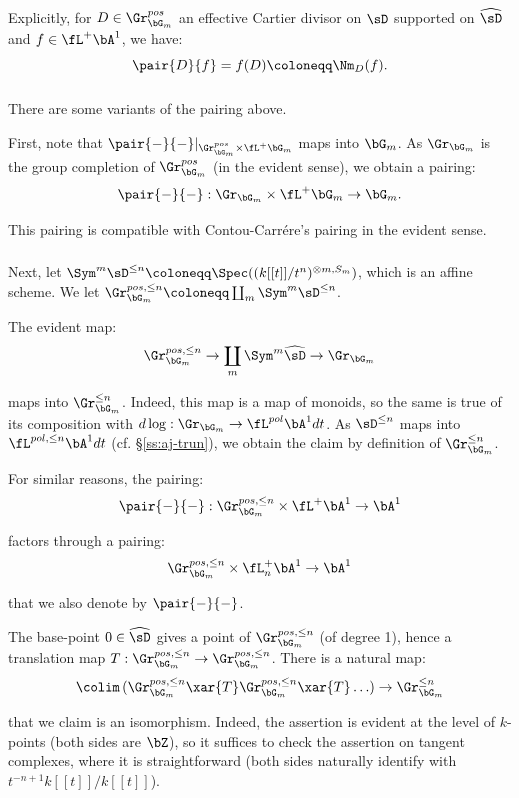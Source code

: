 Explicitly, for $D \in \Gr_{\bG_m}^{pos}$ an effective
Cartier divisor
on $\sD$ supported on $\widehat{\sD}$ and
$f\in \fL^+ \bA^1$, we have:
%
\[
\pair{D}{f} = f(D) \coloneqq \Nm_D(f).
\]

\subsubsection{}

There are some variants of the pairing above.

First, note that
$\pair{-}{-}|_{\Gr_{\bG_m}^{pos} \times \fL^+ \bG_m}$
maps into $\bG_m$. As $\Gr_{\bG_m}$ is the group completion
of $\Gr_{\bG_m}^{pos}$ (in the evident sense), we obtain a
pairing:
%
\[
\pair{-}{-}:\Gr_{\bG_m} \times \fL^+ \bG_m \to
\bG_m.
\]

 This pairing is compatible with Contou-Carr\'ere's
pairing \cite{cc} in the evident sense.

\subsubsection{}

Next, let $\Sym^m \sD^{\leq n} \coloneqq
\Spec((k[[t]]/t^n)^{\otimes m,S_m})$, which is an
affine scheme. We let $\Gr_{\bG_m}^{pos,\leq n}\coloneqq
\coprod_m \Sym^m \sD^{\leq n}$.

The evident map:
%
\[
\Gr_{\bG_m}^{pos,\leq n} \to \coprod_m \Sym^m \widehat{\sD} \to \Gr_{\bG_m}
\]

 maps into $\Gr_{\bG_m}^{\leq n}$. Indeed,
this map is a map of monoids, so the same is
true of its composition with $d\log:\Gr_{\bG_m} \to
\fL^{pol} \bA^1 dt$. As $\sD^{\leq n}$ maps into
$\fL^{pol,\leq n} \bA^1 dt$ (cf. \S \ref{ss:aj-trun}),
we obtain the claim by definition of $\Gr_{\bG_m}^{\leq n}$.


For similar reasons, the pairing:
%
\[
\pair{-}{-}:
\Gr_{\bG_m}^{pos,\leq n} \times \fL^+ \bA^1 \to \bA^1
\]

 factors through a pairing:
%
\[
\Gr_{\bG_m}^{pos,\leq n} \times \fL_n^+ \bA^1 \to \bA^1
\]

 that we also denote by $\pair{-}{-}$.

\begin{rem}
\notready\label{r:gr-n-pos-gp-cpl}

The base-point $0 \in \widehat{\sD}$ gives a point of
$\Gr_{\bG_m}^{pos,\leq n}$ (of degree 1), hence
a translation map $T:\Gr_{\bG_m}^{pos,\leq n} \to \Gr_{\bG_m}^{pos,\leq n}$.
There is a natural map:
%
\[
\colim \, (\Gr_{\bG_m}^{pos,\leq n} \xar{T} \Gr_{\bG_m}^{pos,\leq n} \xar{T} \ldots)
\to \Gr_{\bG_m}^{\leq n}
\]

 that we claim is an isomorphism.
Indeed, the assertion is evident at the level of $k$-points (both sides
are $\bZ$), so it suffices to check the assertion on tangent complexes,
where it is straightforward (both sides naturally identify with
$t^{-n+1}k[[t]]/k[[t]]$).

\end{rem}


